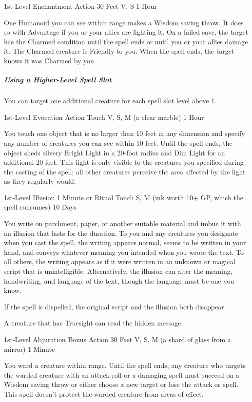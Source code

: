 \documentclass[letterpaper,openany,oneside,twocolumn]{book}
\begin{document}
	{1st-Level Enchantment}
	{Action}
	{30 Feet}
	{V, S}
	{1 Hour}

One Humanoid you can see within range makes a Wisdom saving throw. It does so with Advantage if you or your allies are fighting it. On a failed save, the target has the Charmed condition until the spell ends or until you or your allies damage it. The Charmed creature is Friendly to you. When the spell ends, the target knows it was Charmed by you.

\subparagraph*{Using a Higher-Level Spell Slot} You can target one additional creature for each spell slot level above 1.

	{1st-Level Evocation}
	{Action}
	{Touch}
	{V, S, M (a clear marble)}
	{1 Hour}

You touch one object that is no larger than 10 feet in any dimension and specify any number of creatures you can see within 10 feet. Until the spell ends, the object sheds silvery Bright Light in a 20-foot radius and Dim Light for an additional 20 feet. This light is only visible to the creatures you specified during the casting of the spell; all other creatures perceive the area affected by the light as they regularly would.

	{1st-Level Illusion}
	{1 Minute or Ritual}
	{Touch}
	{S, M (ink worth 10+ GP, which the spell consumes)}
	{10 Days}

You write on parchment, paper, or another suitable material and imbue it with an illusion that lasts for the duration. To you and any creatures you designate when you cast the spell, the writing appears normal, seems to be written in your hand, and conveys whatever meaning you intended when you wrote the text. To all others, the writing appears as if it were written in an unknown or magical script that is unintelligible. Alternatively, the illusion can alter the meaning, handwriting, and language of the text, though the language must be one you know.

If the spell is dispelled, the original script and the illusion both disappear.

A creature that has Truesight can read the hidden message.

	{1st-Level Abjuration}
	{Bonus Action}
	{30 Feet}
	{V, S, M (a shard of glass from a mirror)}
	{1 Minute}

You ward a creature within range. Until the spell ends, any creature who targets the warded creature with an attack roll or a damaging spell must succeed on a Wisdom saving throw or either choose a new target or lose the attack or spell. This spell doesn't protect the warded creature from areas of effect.
\end{document}

